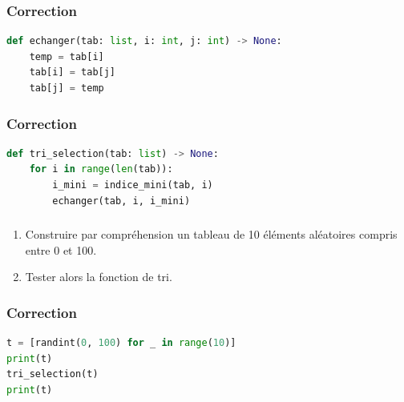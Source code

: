 \documentclass[svgnames,11pt]{beamer}
\begin{document}
\begin{frame}[fragile]
    \frametitle{Correction}

    \begin{center}
        \begin{lstlisting}[language=Python , basicstyle=\ttfamily\small, xleftmargin=2em, xrightmargin=0em]
def echanger(tab: list, i: int, j: int) -> None:
    temp = tab[i]
    tab[i] = tab[j]
    tab[j] = temp
\end{lstlisting}
    \end{center}

\end{frame}
\begin{frame}[fragile]
    \frametitle{Correction}

    \begin{center}
        \begin{lstlisting}[language=Python , basicstyle=\ttfamily\small, xleftmargin=2em, xrightmargin=0em]
def tri_selection(tab: list) -> None:
    for i in range(len(tab)):
        i_mini = indice_mini(tab, i)
        echanger(tab, i, i_mini)
\end{lstlisting}
    \end{center}

\end{frame}
\begin{frame}
    \frametitle{}

    \begin{activite}
    \begin{enumerate}
        \item Construire par compréhension un tableau de 10 éléments aléatoires compris entre 0 et 100.
        \item Tester alors la fonction de tri.
    \end{enumerate}
    \end{activite}

\end{frame}
\begin{frame}[fragile]
    \frametitle{Correction}

\begin{center}
\begin{lstlisting}[language=Python , basicstyle=\ttfamily\small, xleftmargin=2em, xrightmargin=0em]
t = [randint(0, 100) for _ in range(10)]
print(t)
tri_selection(t)
print(t)
\end{lstlisting}
\end{center}

\end{frame}
\end{document}
